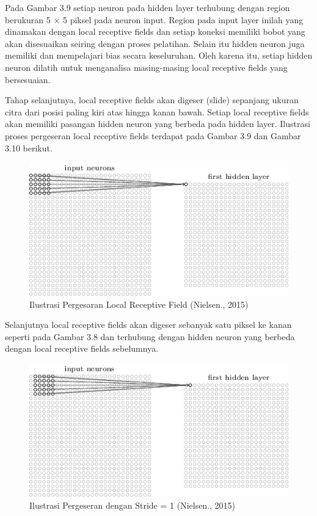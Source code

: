 Pada Gambar 3.9 setiap neuron pada hidden layer terhubung dengan
region berukuran 5 × 5 piksel pada neuron input. Region pada input layer inilah
yang dinamakan dengan local receptive fields dan setiap koneksi memiliki bobot
yang akan disesuaikan seiring dengan proses pelatihan. Selain itu hidden neuron 
juga memiliki dan mempelajari bias secara keseluruhan. Oleh karena itu, setiap
hidden neuron dilatih untuk menganalisa masing-masing local receptive fields yang 
bersesuaian.

Tahap selanjutnya, local receptive fields akan digeser (slide) sepanjang 
ukuran citra dari posisi paling kiri atas hingga kanan bawah. Setiap local receptive
fields akan memiliki pasangan hidden neuron yang berbeda pada hidden layer.
Ilustrasi proses pergeseran local receptive fields terdapat pada Gambar 3.9 dan
Gambar 3.10 berikut.
\begin{figure}[h]
	\centering
	\includegraphics[width=0.65\linewidth]{neuron2}
	\caption{Ilustrasi Pergesaran Local Receptive Field (Nielsen., 2015)}
	\label{fig:neuron2}
\end{figure}

Selanjutnya local receptive fields akan digeser sebanyak satu piksel ke
kanan seperti pada Gambar 3.8 dan terhubung dengan hidden neuron yang 
berbeda dengan local receptive fields sebelumnya.
\begin{figure}[h]
	\centering
	\includegraphics[width=0.65\linewidth]{neuron3}
	\caption{Ilustrasi Pergeseran dengan Stride = 1 (Nielsen., 2015)}
	\label{fig:neuron3}
\end{figure}

